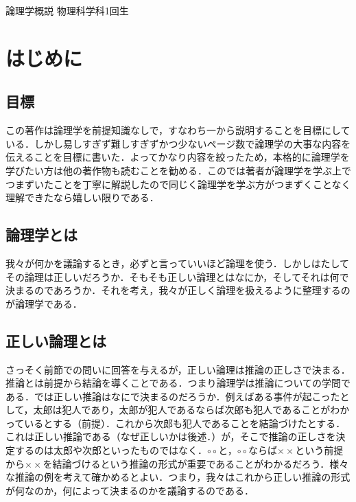 \documentclass[10pt,b5paper,papersize,dvipdfmx]{jsbook}
\begin{document}

\kaishititle%
  {論理学概説}%
  {物理科学科1回生}%
  {}%

\section{はじめに}
\subsection{目標}
この著作は論理学を前提知識なしで，すなわち一から説明することを目標にしている．しかし易しすぎず難しすぎずかつ少ないページ数で論理学の大事な内容を伝えることを目標に書いた．よってかなり内容を絞ったため，本格的に論理学を学びたい方は他の著作物も読むことを勧める．このでは著者が論理学を学ぶ上でつまずいたことを丁寧に解説したので同じく論理学を学ぶ方がつまずくことなく理解できたなら嬉しい限りである．

\subsection{論理学とは}
我々が何かを議論するとき，必ずと言っていいほど論理を使う．しかしはたしてその論理は正しいだろうか．そもそも正しい論理とはなにか，そしてそれは何で決まるのであろうか．それを考え，我々が正しく論理を扱えるように整理するのが論理学である．
\subsection{正しい論理とは}
さっそく前節での問いに回答を与えるが，正しい論理は推論の正しさで決まる．推論とは前提から結論を導くことである．つまり論理学は推論についての学問である．では正しい推論はなにで決まるのだろうか．例えばある事件が起こったとして，太郎は犯人であり，太郎が犯人であるならば次郎も犯人であることがわかっているとする（前提）．これから次郎も犯人であることを結論づけたとする．これは正しい推論である（なぜ正しいかは後述．）が，そこで推論の正しさを決定するのは太郎や次郎といったものではなく．$\circ \circ$と，$\circ \circ$ならば$\times \times$という前提から$\times \times$を結論づけるという推論の形式が重要であることがわかるだろう．様々な推論の例を考えて確かめるとよい．つまり，我々はこれから正しい推論の形式が何なのか，何によって決まるのかを議論するのである．
\end{document}
